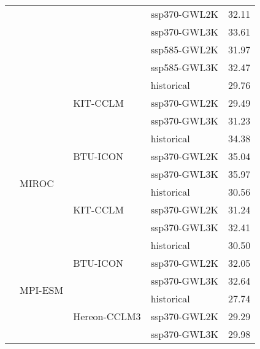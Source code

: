 \begin{table}[!htbp]
\begin{tabular}{lll|l|r}
 &  &  & ssp370-GWL2K & 32.11 \\
 &  &  & ssp370-GWL3K & 33.61 \\
 &  &  & ssp585-GWL2K & 31.97 \\
 &  &  & ssp585-GWL3K & 32.47 \\
\cmidrule(lr){3-5}
 &  & \multirow{3}{*}{KIT-CCLM} & historical & 29.76 \\
 &  &  & ssp370-GWL2K & 29.49 \\
 &  &  & ssp370-GWL3K & 31.23 \\
\cmidrule(lr){3-5}
\cmidrule(lr){2-5}
 & \multirow{6}{*}{MIROC} & \multirow{3}{*}{BTU-ICON} & historical & 34.38 \\
 &  &  & ssp370-GWL2K & 35.04 \\
 &  &  & ssp370-GWL3K & 35.97 \\
\cmidrule(lr){3-5}
 &  & \multirow{3}{*}{KIT-CCLM} & historical & 30.56 \\
 &  &  & ssp370-GWL2K & 31.24 \\
 &  &  & ssp370-GWL3K & 32.41 \\
\cmidrule(lr){3-5}
\cmidrule(lr){2-5}
 & \multirow{6}{*}{MPI-ESM} & \multirow{3}{*}{BTU-ICON} & historical & 30.50 \\
 &  &  & ssp370-GWL2K & 32.05 \\
 &  &  & ssp370-GWL3K & 32.64 \\
\cmidrule(lr){3-5}
 &  & \multirow{3}{*}{Hereon-CCLM3} & historical & 27.74 \\
 &  &  & ssp370-GWL2K & 29.29 \\
 &  &  & ssp370-GWL3K & 29.98 \\
\bottomrule
\end{tabular}
\end{table}

